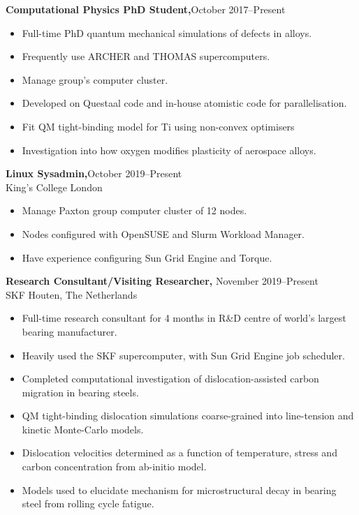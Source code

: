 \documentclass[margin]{res}
\begin{document}
\begin{resume}
{\bf Computational Physics PhD Student,}\hfill October 2017--Present\\
  \begin{itemize} \itemsep -2pt  %
    \item Full-time PhD quantum mechanical simulations of defects in alloys. 
    \item Frequently use ARCHER and THOMAS supercomputers. 
    \item Manage group's computer cluster. 
    \item Developed on Questaal code and in-house atomistic code for parallelisation.
    \item Fit QM tight-binding model for Ti using non-convex optimisers
    \item Investigation into how oxygen modifies plasticity of aerospace alloys. 
  \end{itemize}

{\bf Linux Sysadmin,}\hfill October 2019--Present\\ King's College London
  \begin{itemize} \itemsep -2pt  %
    \item Manage Paxton group computer cluster of 12 nodes. 
    \item Nodes configured with OpenSUSE and Slurm Workload Manager. 
    \item Have experience configuring Sun Grid Engine and Torque. 
  \end{itemize}
  
  

 {\bf Research Consultant/Visiting Researcher,} \hfill November 2019--Present\\ SKF Houten, The Netherlands
  \begin{itemize} \itemsep -2pt  %
    \item Full-time research consultant for 4 months in R\&D centre of world's largest bearing manufacturer.
    \item Heavily used the SKF supercomputer, with Sun Grid Engine job scheduler. 
    \item Completed computational investigation of dislocation-assisted carbon migration in bearing steels. 
    \item QM tight-binding dislocation simulations coarse-grained into line-tension and kinetic Monte-Carlo models. 
    \item Dislocation velocities determined as a function of temperature, stress and carbon concentration from ab-initio model. 
    \item Models used to elucidate mechanism for microstructural decay in bearing steel from rolling cycle fatigue.  
  \end{itemize}




\end{resume}
\end{document}
